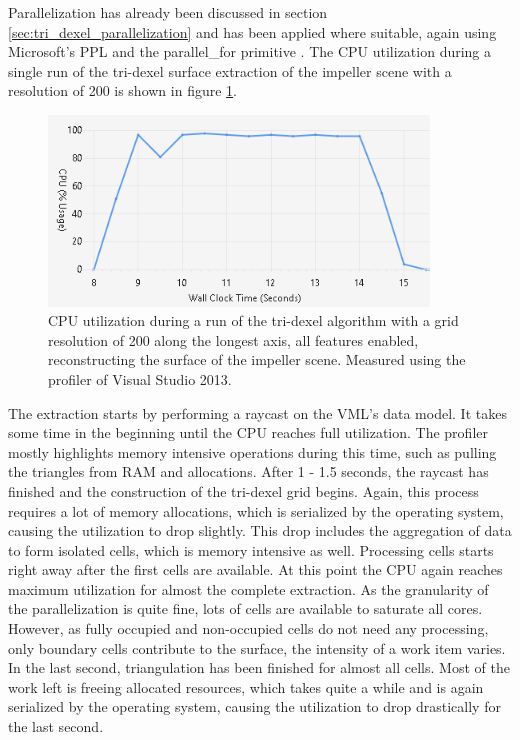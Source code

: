 Parallelization has already been discussed in section \ref{sec:tri_dexel_parallelization} and has been applied where suitable, again using Microsoft's PPL and the parallel\_for primitive \cite{ppl_parallel_for}.
The CPU utilization during a single run of the tri-dexel surface extraction of the impeller scene with a resolution of 200 is shown in figure \ref{fig:td_hq_impeller_cpu}.
%
\begin{figure}
	\centering
	\includegraphics[width=0.9\textwidth]{images/td_hq_impeller_cpu}
	\caption{
		CPU utilization during a run of the tri-dexel algorithm with a grid resolution of 200 along the longest axis, all features enabled, reconstructing the surface of the impeller scene.
		Measured using the profiler of Visual Studio 2013.
	}
	\label{fig:td_hq_impeller_cpu}
\end{figure}
%
The extraction starts by performing a raycast on the VML's data model.
It takes some time in the beginning until the CPU reaches full utilization.
The profiler mostly highlights memory intensive operations during this time, such as pulling the triangles from RAM and allocations.
After 1 - 1.5 seconds, the raycast has finished and the construction of the tri-dexel grid begins.
Again, this process requires a lot of memory allocations, which is serialized by the operating system, causing the utilization to drop slightly.
This drop includes the aggregation of data to form isolated cells, which is memory intensive as well.
Processing cells starts right away after the first cells are available.
At this point the CPU again reaches maximum utilization for almost the complete extraction.
As the granularity of the parallelization is quite fine, \ie lots of cells are available to saturate all cores.
However, as fully occupied and non-occupied cells do not need any processing, only boundary cells contribute to the surface, the intensity of a work item varies.
In the last second, triangulation has been finished for almost all cells.
Most of the work left is freeing allocated resources, which takes quite a while and is again serialized by the operating system, causing the utilization to drop drastically for the last second.
